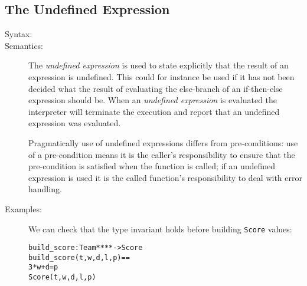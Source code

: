 \documentclass[\pformat,12pt]{article}
\begin{document}
\subsection{The Undefined Expression}

\begin{description}
\item[Syntax:]

  
\item[Semantics:] The {\it undefined expression} is used to state
  explicitly that the result of an expression is undefined. This could
  for instance be used if it has not been decided what the result of
  evaluating the else-branch of an if-then-else expression should be.
  When an {\it undefined expression} is evaluated the
  interpreter will terminate the execution
  and report that an undefined expression was evaluated.

  Pragmatically use of undefined expressions differs from
  pre-conditions: use of a pre-condition means it is the caller's
  responsibility to ensure that the pre-condition is satisfied when
  the function is called; if an undefined expression is used it is the
  called function's responsibility to deal with error handling.

\item[Examples:] We can check that the type invariant holds before building 
  \texttt{Score} values:
  \begin{alltt}
  build_score : Team *  *  *  *  -> Score
  build_score (t,w,d,l,p) ==
     3 * w + d = p
     Score(t,w,d,l,p)
  \end{alltt}
\end{description}
\end{document}

